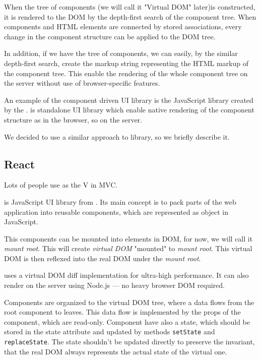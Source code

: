 \documentclass[oneside, 12pt]{book}
\begin{document}
  When the tree of components (we will call it "Virtual DOM" later)is constructed, 
  it is rendered to the DOM by the depth-first search of the component tree.
  When components and HTML elements are connected by stored associations, 
  every change in the component structure can be applied to the DOM tree. 

  In addition, if we have the tree of components, we can easily, by the similar depth-first search, 
  create the markup string representing the HTML markup of the component tree.
  This enable the rendering of the whole component tree on the server without use of browser-specific features.

  An example of the component driven UI library is the JavaScript library \react created by the \facebook.
  \react is standalone UI library which enable native rendering of the component structure as in the browser, so on the server.

  We decided to use a similar approach to \react library, so we briefly describe it.

  \subsection{React}\label{subsec:existing-component-react}
    
    Lots of people use \react as the V in MVC.\cite{react}

    \react is JavaScript UI library from \facebook. 
    Its main concept is to pack parts of the web application into reusable components, 
    which are represented as object in JavaScript. 

    This components can be mounted into elements in DOM, for now, we will call it \textit{mount root}. 
    This will create \textit{virtual DOM} "mounted" to \textit{mount root}. 
    This virtual DOM is then reflexed into the real DOM under the \textit{mount root}.

    \react uses a virtual DOM diff implementation for ultra-high performance. 
    It can also render on the server using Node.js — no heavy browser DOM required.\cite{react}

    Components are organized to the virtual DOM tree, where a data flows from the root component to leaves. 
    This data flow is implemented by the props of the component, which are read-only.
    Component have also a state, which should be stored in the state attribute and updated by methods \texttt{setState} and \texttt{replaceState}. 
    The state shouldn't be updated directly to preserve the invariant, that the real DOM always represents the actual state of the virtual one. 
\end{document}
